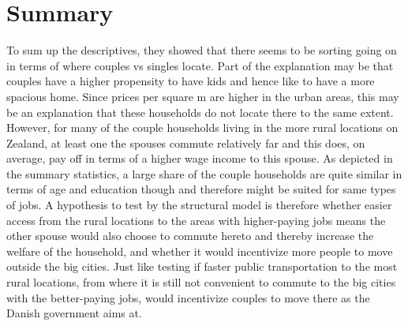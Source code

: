 \section{Summary}
To sum up the descriptives, they showed that there seems to be sorting going on in terms of where couples vs singles locate. Part of the explanation may be that couples have a higher propensity to have kids and hence like to have a more spacious home. Since prices per square m are higher in the urban areas, this may be an explanation that these households do not locate there to the same extent. However, for many of the couple households living in the more rural locations on Zealand, at least one the spouses commute relatively far and this does, on average, pay off in terms of a higher wage income to this spouse. As depicted in the summary statistics, a large share of the couple households are quite similar in terms of age and education though and therefore might be suited for same types of jobs. A hypothesis to test by the structural model is therefore whether easier access from the rural locations to the areas with higher-paying jobs means the other spouse would also choose to commute hereto and thereby increase the welfare of the household, and whether it would incentivize more people to move outside the big cities. Just like testing if faster public transportation to the most rural locations, from where it is still not convenient to commute to the big cities with the better-paying jobs, would incentivize couples to move there as the Danish government aims at. 




